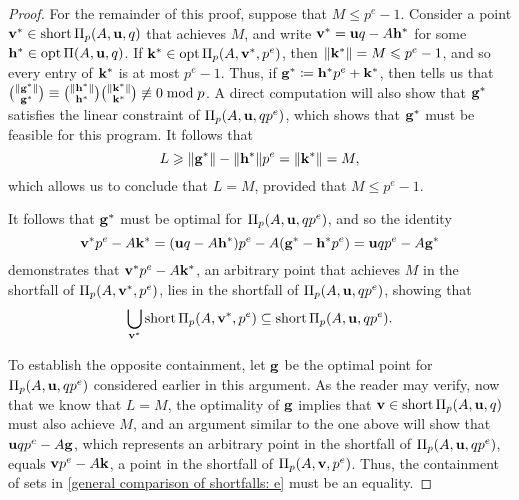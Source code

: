 \documentclass{amsart}
\begin{document}
\begin{proof}
   For the remainder of this proof, suppose that $M \leq p^e-1$.
   Consider a point  $\mathbf{v}^{\ast} \in \operatorname{short} \Pi_p(A, \mathbf{u}, q)$ that achieves $M$, and write $\mathbf{v}^{\ast} = \mathbf{u}q - A \mathbf{h}^{\ast}$ for some $\mathbf{h}^{\ast} \in \operatorname{opt} \Pi(A, \mathbf{u}, q)$.
   If $\mathbf{k}^{\ast} \in \operatorname{opt} \Pi_p(A, \mathbf{v}^{\ast}, p^e)$, then $\| \mathbf{k}^{\ast} \| = M \leqslant p^e-1$, and so every entry of $\mathbf{k}^{\ast}$ is at most $p^e - 1$.
   Thus, if $\mathbf{g}^{\ast} \coloneqq \mathbf{h}^{\ast} p^e + \mathbf{k}^{\ast}$, then  tells us that $\binom{\| \mathbf{g}^{\ast} \|}{\mathbf{g}^{\ast}} \equiv  \binom{\| \mathbf{h}^{\ast} \|}{\mathbf{h}^{\ast}} \binom{\| \mathbf{k}^{\ast} \|}{\mathbf{k}^{\ast}} \not \equiv 0 \bmod p$.
   A direct computation will also show that $\mathbf{g}^{\ast}$ satisfies the linear constraint of  $\Pi_p(A, \mathbf{u}, qp^e)$, which shows that $\mathbf{g}^{\ast}$ must be feasible for this program.
   It follows that
   \[ L \geqslant \| \mathbf{g}^{\ast} \| - \| \mathbf{h}^{\ast} \|p^e = \| \mathbf{k}^{\ast} \| = M, \]
   which allows us to conclude that $L=M$, provided that $M \leq p^e-1$.

   It follows that $\mathbf{g}^{\ast}$ must be optimal for $\Pi_p(A, \mathbf{u}, qp^e)$, and so the identity
   \[  \mathbf{v}^{\ast} p^e-A\mathbf{k}^{\ast} = (\mathbf{u}q-A\mathbf{h}^{\ast})p^e-A(\mathbf{g}^{\ast}-\mathbf{h}^{\ast}p^e) = \mathbf{u}qp^e-A \mathbf{g}^{\ast} \]
   demonstrates that $\mathbf{v}^{\ast} p^e-A\mathbf{k}^{\ast}$, an arbitrary point that achieves $M$ in the shortfall of $\Pi_p(A, \mathbf{v}^{\ast}, p^e)$, lies in the shortfall of $\Pi_p(A, \mathbf{u},qp^e)$, showing that
   \begin{equation}
      \label{general comparison of shortfalls: e}
      \bigcup_{\mathbf{v}^{\ast}} \operatorname{short} \Pi_p(A, \mathbf{v}^{\ast}, p^e) \subseteq \operatorname{short} \Pi_p(A, \mathbf{u}, qp^e).
   \end{equation}

   To establish the opposite containment, let $\mathbf{g}$ be the optimal point for $\Pi_p(A, \mathbf{u}, qp^e)$ considered earlier in this argument.
   As the reader may verify, now that we know that $L=M$, the optimality of $\mathbf{g}$ implies that $\mathbf{v} \in \operatorname{short} \Pi_p(A, \mathbf{u}, q)$ must also achieve $M$, and an argument similar to the one above will show that $\mathbf{u}qp^e - A \mathbf{g}$, which represents an arbitrary point in the shortfall of $\Pi_p(A, \mathbf{u}, qp^e)$, equals $\mathbf{v}p^e-A\mathbf{k}$, a point in the shortfall of $\Pi_p(A, \mathbf{v}, p^e)$.
   Thus, the containment of sets in \eqref{general comparison of shortfalls: e} must be an equality.
\end{proof}
\end{document}
